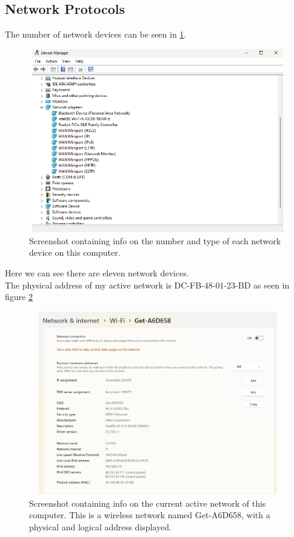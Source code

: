 \documentclass[11pt, A4paper, english]{article}
\begin{document}
		\subsection{Network Protocols}
The number of network devices can be seen in \ref{im:net_info}.
			\begin{figure}
\includegraphics[width=12.6cm, height=8cm]{network_info.png}
\caption{Screenshot containing info on the number and type of each network device on this computer.}
\label{im:net_info}	
			\end{figure}
Here we can see there are eleven network devices. \\
The physical address of my active network is DC-FB-48-01-23-BD as seen in figure \ref{im:net_ad} \\
			\begin{figure}
\includegraphics[width=12.6cm, height=8cm]{network_address.png}
\caption{Screenshot containing info on the current active network of this computer. This is a wireless network named Get-A6D658, with a physical and logical address displayed.}
\label{im:net_ad}	
			\end{figure}
\end{document}
